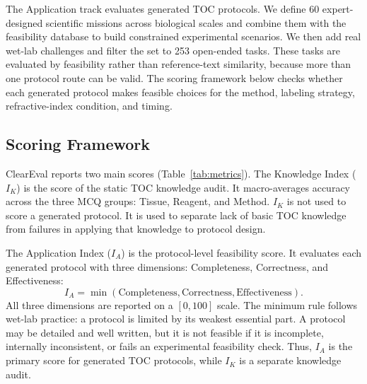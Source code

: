 \documentclass[conference]{IEEEtran}
\begin{document}
The Application track evaluates generated TOC protocols. We define 60
expert-designed scientific missions across biological scales and combine them
with the feasibility database to build constrained experimental scenarios. We
then add real wet-lab challenges and filter the set to 253 open-ended tasks.
These tasks are evaluated by feasibility rather than reference-text similarity,
because more than one protocol route can be valid. The scoring framework below
checks whether each generated protocol makes feasible choices for the method,
labeling strategy, refractive-index condition, and timing.

\subsection{Scoring Framework}

ClearEval reports two main scores (Table~\ref{tab:metrics}). The Knowledge
Index ($I_K$) is the score of the static TOC knowledge audit. It macro-averages
accuracy across the three MCQ groups: Tissue, Reagent, and Method. $I_K$ is not
used to score a generated protocol. It is used to separate lack of basic TOC
knowledge from failures in applying that knowledge to protocol design.

The Application Index ($I_A$) is the protocol-level feasibility score. It
evaluates each generated protocol with three dimensions: Completeness,
Correctness, and Effectiveness:
\begin{equation}
I_A = \min(\text{Completeness}, \text{Correctness}, \text{Effectiveness}).
\end{equation}
All three dimensions are reported on a $[0,100]$ scale. The minimum rule follows
wet-lab practice: a protocol is limited by its weakest essential part. A
protocol may be detailed and well written, but it is not feasible if it is
incomplete, internally inconsistent, or fails an experimental feasibility check.
Thus, $I_A$ is the primary score for generated TOC protocols, while $I_K$ is a
separate knowledge audit.
\end{document}

